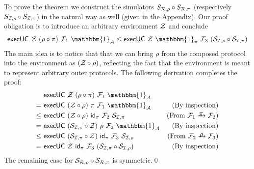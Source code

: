 \noindent \proof To prove the theorem we construct the simulators $S_{\mathcal{{R}},\rho} \circ S_{\mathcal{{R}},\pi}$ (respectively $S_{\mathcal{{I}},\rho} \circ S_{\mathcal{{I,\pi}}}$) in the natural way as well (given in the Appendix).
Our proof obligation is to introduce an arbitrary environment $\mathcal{{Z}}$ and conclude
\[  \keyword{execUC}~\mc{Z} ~(\rho \circ \pi)~\mc{F}_1 ~\mathbbm{1}_\mc{A}
\le \keyword{execUC}~\mc{Z} ~\mathbbm{1}_\mc{\pi} ~\mc{F}_3 ~(\mc{S}_{\mc{I},\rho} \circ \mc{S}_{\mc{I},\pi})
\]
\noindent
%
The main idea is to notice that that we can bring $\rho$ from the composed protocol into the environment as $(\mathcal{{Z}}\circ \rho)$, reflecting the fact that the environment is meant to represent arbitrary outer protocols. The following derivation completes the proof:
\begin{align*}
    &~ \keyword{execUC}~\mc{Z}~(\rho \circ \pi)~\mc{F}_1~ \mathbbm{1}_\mc{A} & \\
  = &~ \keyword{execUC}~(\mc{Z}\circ \rho)~\pi~\mc{F}_1~ \mathbbm{1}_\mc{A} &
  \textnormal{(By inspection)} \\
\le&~ \keyword{execUC}~(\mc{Z}\circ \rho)~\mathsf{id}_\pi ~\mc{F}_2~ \mc{S}_{\mc{I},\pi} & (\textnormal{From}~ \mc{F}_1 \yrightarrow{$\pi$} \mc{F}_2) \\
 = &~ \keyword{execUC}~(\mc{S}_{\mc{I},\pi}\circ \mc{Z})~\rho ~\mc{F}_2~ \mathbbm{1}_\mc{A} &  \textnormal{(By inspection)} \\
\le&~ \keyword{execUC}~(\mc{S}_{\mc{I},\pi}\circ\mc{Z})~\mathsf{id}_\pi~\mc{F}_3~\mc{S}_{\mc{I},\rho} &
(\textnormal{From}~ \mc{F}_2 \yrightarrow{$\rho$} \mc{F}_3) \\
= &~ \keyword{execUC}~\mc{Z}~ \mathsf{id}_\pi~ \mc{F}_3~ (\mc{S}_{\mc{I},\pi} \circ \mc{S}_{\mc{I},\rho}) &
\textnormal{(By inspection)}
\end{align*}
The remaining case for $\mathcal{{S}}_{\mathcal{{R}},\rho} \circ \mathcal{{S}}_{\mathcal{{R}},\pi}$ is symmetric.\qed
